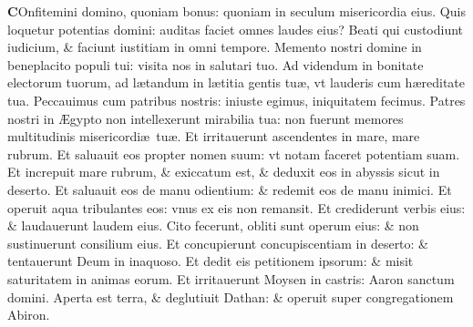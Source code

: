 \documentclass[a5paper,10pt]{book}
\def\ae{æ}
\def\AE{Æ}
\begin{document}
\begin{multicols*}{2}
\vspace{-.5em}
\lettrine[lines=2]{\bfseries \color{red} C}{}Onfitemini domino, quoniam bonus: quoniam in seculum misericordia eius.
\newline \color{red} Q\color{black}uis loquetur potentias domini: auditas faciet omnes laudes eius?
\newline \color{red} B\color{black}eati qui custodiunt iudicium, \& faciunt iustitiam in omni tempore.
\newline \color{red} M\color{black}emento nostri domine in beneplacito populi tui: visita nos in salutari tuo.
\newline \color{red} A\color{black}d videndum in bonitate electorum tuorum, ad l\ae tandum in l\ae titia gentis tu\ae , vt lauderis cum h\ae reditate tua.
\newline \color{red} P\color{black}eccauimus cum patribus nostris: iniuste egimus, iniquitatem fecimus.
\newline \color{red} P\color{black}atres nostri in \AE gypto non intellexerunt mirabilia tua: non fuerunt memores multitudinis misericordi\ae \ tu\ae .
\newline \color{red} E\color{black}t irritauerunt ascendentes in mare, mare rubrum.
\newline \color{red} E\color{black}t saluauit eos propter nomen suum: vt notam faceret potentiam suam.
\newline \color{red} E\color{black}t increpuit mare rubrum, \& exiccatum est, \& deduxit eos in abyssis sicut in deserto.
\newline \color{red} E\color{black}t saluauit eos de manu odientium: \& redemit eos de manu inimici.
\newline \color{red} E\color{black}t operuit aqua tribulantes eos: vnus ex eis non remansit.
\newline \color{red} E\color{black}t crediderunt verbis eius: \& laudauerunt laudem eius.
\newline \color{red} C\color{black}ito fecerunt, obliti sunt operum eius: \& non sustinuerunt consilium eius.
\newline \color{red} E\color{black}t concupierunt concupiscentiam in deserto: \& tentauerunt Deum in inaquoso.
\newline \color{red} E\color{black}t dedit eis petitionem ipsorum: \& misit saturitatem in animas eorum.
\newline \color{red} E\color{black}t irritauerunt Moysen in castris: Aaron sanctum domini.
\newline \color{red} A\color{black}perta est terra, \& deglutiuit Dathan: \& operuit super congregationem Abiron.

\end{multicols*}
\end{document}

